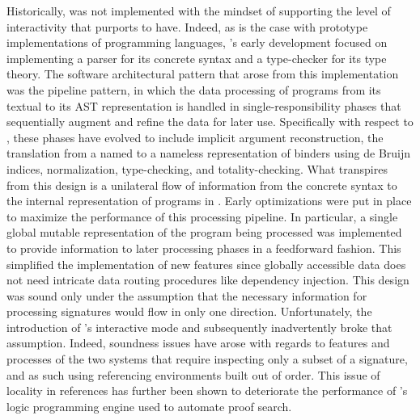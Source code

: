Historically, \Beluga was not implemented with the mindset of supporting the level of interactivity that \Harpoon purports to have.
Indeed, as is the case with prototype implementations of programming languages, \Beluga's early development focused on implementing a parser for its concrete syntax and a type-checker for its type theory.
The software architectural pattern that arose from this implementation was the pipeline pattern, in which the data processing of programs from its textual to its \ac{AST} representation is handled in single-responsibility phases that sequentially augment and refine the data for later use.
Specifically with respect to \Beluga, these phases have evolved to include implicit argument reconstruction, the translation from a named to a nameless representation of binders using de Bruijn indices, normalization, type-checking, and totality-checking.
What transpires from this design is a unilateral flow of information from the concrete syntax to the internal representation of programs in \Beluga.
Early optimizations were put in place to maximize the performance of this processing pipeline.
In particular, a single global mutable representation of the \Beluga program being processed was implemented to provide information to later processing phases in a feedforward fashion.
This simplified the implementation of new features since globally accessible data does not need intricate data routing procedures like dependency injection.
This design was sound only under the assumption that the necessary information for processing \Beluga signatures would flow in only one direction.
Unfortunately, the introduction of \Beluga's interactive mode and subsequently \Harpoon inadvertently broke that assumption.
Indeed, soundness issues have arose with regards to features and processes of the two systems that require inspecting only a subset of a signature, and as such using referencing environments built out of order.
This issue of locality in references has further been shown to deteriorate the performance of \Beluga's logic programming engine used to automate proof search.


